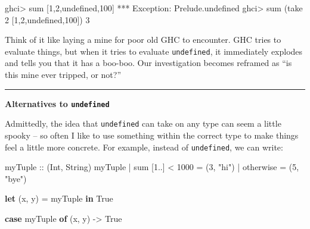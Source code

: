 \documentclass[]{article}
\newenvironment{Shaded}{}{}
\newcommand{\DataTypeTok}[1]{\textcolor[rgb]{0.56,0.13,0.00}{#1}}
\newcommand{\DecValTok}[1]{\textcolor[rgb]{0.25,0.63,0.44}{#1}}
\newcommand{\FunctionTok}[1]{\textcolor[rgb]{0.02,0.16,0.49}{#1}}
\newcommand{\KeywordTok}[1]{\textcolor[rgb]{0.00,0.44,0.13}{\textbf{#1}}}
\newcommand{\NormalTok}[1]{#1}
\newcommand{\OperatorTok}[1]{\textcolor[rgb]{0.40,0.40,0.40}{#1}}
\newcommand{\OtherTok}[1]{\textcolor[rgb]{0.00,0.44,0.13}{#1}}
\newcommand{\StringTok}[1]{\textcolor[rgb]{0.25,0.44,0.63}{#1}}
\begin{document}
\begin{Shaded}
\begin{Highlighting}[]
\NormalTok{ghci}\OperatorTok{>} \FunctionTok{sum}\NormalTok{ [}\DecValTok{1}\NormalTok{,}\DecValTok{2}\NormalTok{,}\FunctionTok{undefined}\NormalTok{,}\DecValTok{100}\NormalTok{]}
\OperatorTok{***} \DataTypeTok{Exception}\OperatorTok{:}\NormalTok{ Prelude.undefined}
\NormalTok{ghci}\OperatorTok{>} \FunctionTok{sum}\NormalTok{ (}\FunctionTok{take} \DecValTok{2}\NormalTok{ [}\DecValTok{1}\NormalTok{,}\DecValTok{2}\NormalTok{,}\FunctionTok{undefined}\NormalTok{,}\DecValTok{100}\NormalTok{])}
\DecValTok{3}
\end{Highlighting}
\end{Shaded}

Think of it like laying a mine for poor old GHC to encounter. GHC tries to
evaluate things, but when it tries to evaluate \texttt{undefined}, it
immediately explodes and tells you that it has a boo-boo. Our investigation
becomes reframed as ``is this mine ever tripped, or not?''

\begin{center}\rule{0.5\linewidth}{\linethickness}\end{center}

\textbf{Alternatives to \texttt{undefined}}

Admittedly, the idea that \texttt{undefined} can take on any type can seem a
little spooky -- so often I like to use something within the correct type to
make things feel a little more concrete. For example, instead of
\texttt{undefined}, we can write:

\begin{Shaded}
\begin{Highlighting}[]
\OtherTok{myTuple ::}\NormalTok{ (}\DataTypeTok{Int}\NormalTok{, }\DataTypeTok{String}\NormalTok{)}
\NormalTok{myTuple}
  \OperatorTok{|} \FunctionTok{sum}\NormalTok{ [}\DecValTok{1}\OperatorTok{..}\NormalTok{] }\OperatorTok{<} \DecValTok{1000} \OtherTok{=}\NormalTok{ (}\DecValTok{3}\NormalTok{, }\StringTok{"hi"}\NormalTok{)}
  \OperatorTok{|} \FunctionTok{otherwise}        \OtherTok{=}\NormalTok{ (}\DecValTok{5}\NormalTok{, }\StringTok{"bye"}\NormalTok{)}

\KeywordTok{let}\NormalTok{ (x, y) }\OtherTok{=}\NormalTok{ myTuple}
\KeywordTok{in}  \DataTypeTok{True}

\KeywordTok{case}\NormalTok{ myTuple }\KeywordTok{of}
\NormalTok{    (x, y) }\OtherTok{{-}>} \DataTypeTok{True}
\end{Highlighting}
\end{Shaded}
\end{document}
